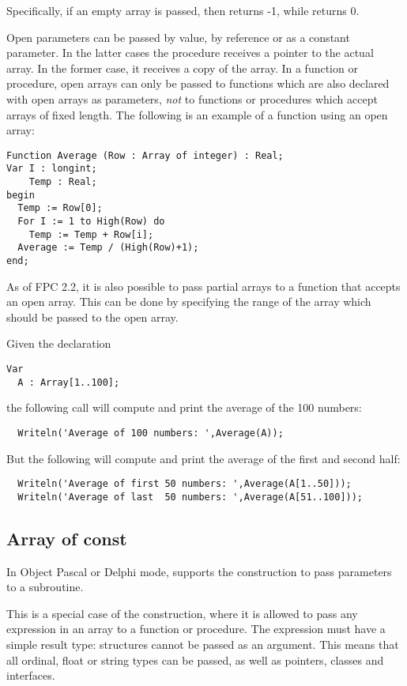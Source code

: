Specifically, if an empty array is passed, then  returns -1, 
while  returns 0.

Open parameters can be passed by value, by reference or as a constant
parameter. In the latter cases the procedure receives a pointer to the
actual array. In the former case, it receives a copy of the array.
In a function or procedure, open arrays can only be passed to functions which
are also declared with open arrays as parameters, {\em not} to functions or
procedures which accept arrays of fixed length.
The following is an example of a function using an open array:
\begin{verbatim}
Function Average (Row : Array of integer) : Real;
Var I : longint;
    Temp : Real;
begin
  Temp := Row[0];
  For I := 1 to High(Row) do
    Temp := Temp + Row[i];
  Average := Temp / (High(Row)+1);
end;
\end{verbatim}

As of FPC 2.2, it is also possible to pass partial arrays to a function that
accepts an open array. This can be done by specifying the range of the array
which should be passed to the open array.

Given the declaration
\begin{verbatim}
Var
  A : Array[1..100];
\end{verbatim}
the following call will compute and print the average of the 100 numbers:
\begin{verbatim}
  Writeln('Average of 100 numbers: ',Average(A));
\end{verbatim}
But the following will compute and print the average of the first and second
half:
\begin{verbatim}
  Writeln('Average of first 50 numbers: ',Average(A[1..50]));
  Writeln('Average of last  50 numbers: ',Average(A[51..100]));
\end{verbatim} 

\subsection{Array of const}
In Object Pascal or Delphi mode, \fpc supports the 
construction to pass parameters to a subroutine.

This is a special case of the  construction, where it is
allowed to pass any expression in an array to a function or procedure. 
The expression must have a simple result type: structures cannot be passed
as an argument. This means that all ordinal, float or string types can be
passed, as well as pointers, classes and interfaces.

